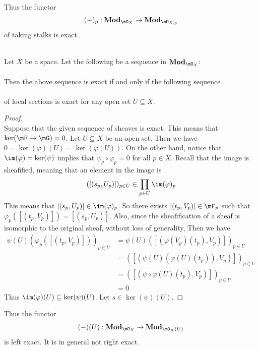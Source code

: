 \documentclass[a4paper]{article}
\begin{document}
Thus the functor $$(-)_p:\bold{Mod}_{\mO_X}\to\bold{Mod}_{\mO_{X,p}}$$ of taking stalks is exact. 

\begin{prp}{}{}\\
Let $X$ be a space. Let the following be a sequence in $\bold{Mod}_{\mO_X}$: \\
\\
Then the above sequence is exact if and only if the following sequence \\
\\
of local sections is exact for any open set $U\subseteq X$. 
\begin{proof}\\
Suppose that the given sequence of sheaves is exact. This means that $\ker(\mF\to\mG)=0$. Let $U\subseteq X$ be an open set. Then we have $0=\ker(\varphi)(U)=\ker(\varphi(U))$. On the other hand, notice that $\im(\varphi)=\ker(\psi)$ implies that $\psi_p\circ\varphi_p=0$ for all $p\in X$. Recall that the image is sheafified, meaning that an element in the image is $$([(s_p,U_p)])_{p\in U}\in\prod_{p\in U}\im(\varphi)_p$$ This means that $[(s_p,U_p)]\in\im(\varphi)_p$. So there exists $[(t_p,V_p)]\in\mF_p$ such that $\varphi_p([(t_p,V_p)])=[(s_p,U_p)]$. Also, since the sheafification of a sheaf is isomorphic to the original sheaf, without loss of generality, Then we have 
\begin{align*}
\psi(U)\left(\varphi_p([(t_p,V_p)])\right)_{p\in U}&=\psi(U)\left([(\varphi(V_p)(t_p),V_p)]\right)_{p\in U}\\
&=\left([(\psi(U)(\varphi(U)(t_p)),V_p)]\right)_{p\in U}\\
&=\left([(\psi\circ\varphi(U)(t_p),V_p)]\right)_{p\in U}\\
&=0
\end{align*}
Thus $\im(\varphi)(U)\subseteq\ker(\psi)(U)$. Let $s\in\ker(\psi)(U)$. 
\end{proof}
\end{prp}

Thus the functor $$(-)(U):\bold{Mod}_{\mO_X}\to\bold{Mod}_{\mO_X(U)}$$ is left exact. It is in general not right exact. 
\end{document}
